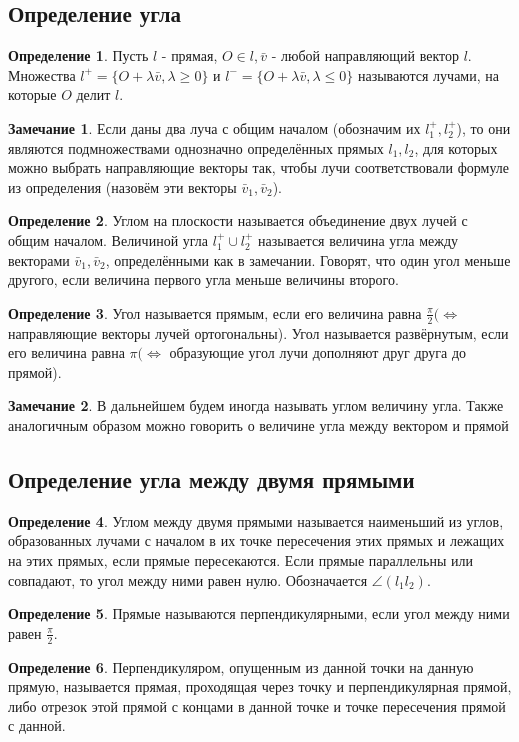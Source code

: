 \documentclass[a4paper, 12pt]{article}
\theoremstyle{definition}
\newtheorem*{definition}{Определение}
\newtheorem*{remark}{Замечание}
\begin{document}
	\subsection{Определение угла}
	\begin{definition}
		Пусть $l$ - прямая, $O \in l, \bar{v}$ - любой направляющий вектор $l$. Множества $l^{+} = \{O + \lambda\bar{v}, \lambda \geqslant 0\}$ и $l^{-} = \{O + \lambda\bar{v}, \lambda \leqslant 0\}$ называются лучами, на которые $O$ делит $l$. 
	\end{definition}
	\begin{remark}
		Если даны два луча с общим началом (обозначим их $l_{1}^{+}, l_{2}^{+}$), то они являются подмножествами однозначно определённых прямых $l_{1}, l_{2}$, для которых можно выбрать направляющие векторы так, чтобы лучи соответствовали формуле из определения (назовём эти векторы $\bar{v}_{1}, \bar{v}_{2}$).
	\end{remark}
	\begin{definition}
		Углом на плоскости называется объединение двух лучей с общим началом. Величиной угла $l_{1}^{+}\cup l_{2}^{+}$ называется величина угла между векторами $\bar{v}_{1}, \bar{v}_{2}$, определёнными как в замечании. Говорят, что один угол меньше другого, если величина первого угла меньше величины второго.
	\end{definition}
	\begin{definition}
		Угол называется прямым, если его величина равна $\frac{\pi}{2} (\Leftrightarrow$ направляющие векторы лучей ортогональны). Угол называется развёрнутым, если его величина равна $\pi (\Leftrightarrow$ образующие угол лучи дополняют друг друга до прямой).
	\end{definition}
	\begin{remark}
		В дальнейшем будем иногда называть углом величину угла. Также аналогичным образом можно говорить о величине угла между вектором и прямой
	\end{remark}
	\subsection{Определение угла между двумя прямыми}
	\begin{definition}
		Углом между двумя прямыми называется наименьший из углов, образованных лучами с началом в их точке пересечения этих прямых и лежащих на этих прямых, если прямые пересекаются. Если прямые параллельны или совпадают, то угол между ними равен нулю. Обозначается $\angle({l_{1}}{l_{2}})$.
	\end{definition}
	\begin{definition}
		Прямые называются перпендикулярными, если угол между ними равен $\frac{\pi}{2}$.
	\end{definition}
	\begin{definition}
		Перпендикуляром, опущенным из данной точки на данную прямую, называется прямая, проходящая через точку и перпендикулярная прямой, либо отрезок этой прямой с концами в данной точке и точке пересечения прямой с данной. 
	\end{definition}
\end{document}
